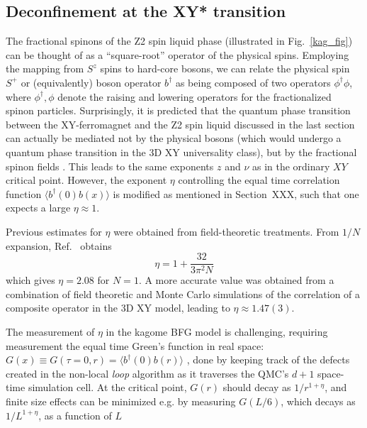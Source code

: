 \documentclass[range]{ar2e}
\begin{document}
\subsection{Deconfinement at the XY* transition} \label{XYstar}

The fractional spinons of the Z2 spin liquid phase (illustrated in Fig.~\ref{kag_fig}) can be thought of as a ``square-root'' operator of the physical spins.  Employing the mapping from $S^z$ spins to hard-core bosons, we can relate the physical spin $S^+$ or (equivalently) boson operator $b^{\dagger}$ as being composed of two operators  $\phi^\dagger \phi$, where $\phi^\dagger,\phi$ denote the raising and lowering operators for the fractionalized spinon particles.  
Surprisingly, it is predicted that the quantum phase transition between the XY-ferromagnet and the Z2 spin liquid discussed in the last section can actually be mediated not by the physical bosons (which would undergo a quantum phase transition in the 3D XY universality class), but by the fractional spinon fields \cite{XYstar1,XYstar2,earlyXYstar}.  This leads to the same exponents $z$ and $\nu$ as in the ordinary $XY$ critical point.  However, the exponent $\eta$ controlling the equal time correlation function $\langle b^\dagger(0) b(x) \rangle$ is modified as mentioned in Section~XXX, such that one expects a large $\eta \approx 1$.

Previous estimates for $\eta$ were obtained from field-theoretic treatments.  From $1/N$ expansion, Ref.~\cite{XYstar2} obtains
\begin{equation}
\eta = 1 + \frac{32}{3 \pi^2 N}
\end{equation}
which gives $\eta = 2.08$ for $N=1$.
A more accurate value was obtained from a combination of field theoretic and Monte Carlo simulations of the correlation of a composite operator in the 3D XY model\cite{compositefieldtheory,compositeMC}, leading to $\eta\approx  1.47(3)$.

The measurement of $\eta$ in the kagome BFG model is challenging, requiring measurement the equal time Green's function in real space: $G(x)\equiv G(\tau=0,r) = \langle b^\dagger(0) b(r) \rangle$ \cite{WormA,gfsse}, done by keeping track of the defects created in the non-local {\it loop} algorithm \cite{Syljuasen02} as it traverses the QMC's $d+1$ space-time simulation cell.  At the critical point, $G(r)$ should decay as $1/r^{1+\eta}$, and finite size effects can be minimized e.g. by measuring $G(L/6)$, which decays as $1/L^{1+\eta}$, as a function of $L$
\end{document}
